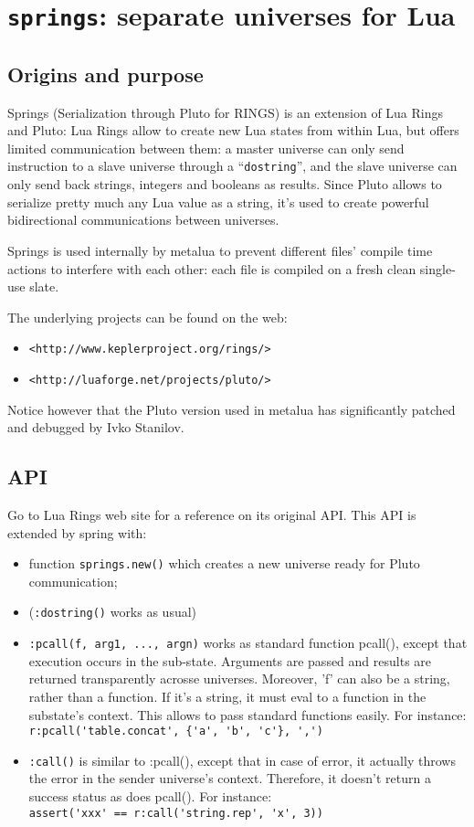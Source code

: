 \section{{\tt springs}: separate universes for Lua} 

\subsection{Origins and purpose}
Springs (Serialization through Pluto for RINGS) is an extension of Lua Rings and
Pluto: Lua Rings allow to create new Lua states from within Lua, but offers
limited communication between them: a master universe can only send instruction
to a slave universe through a ``{\tt dostring}'', and the slave universe can
only send back strings, integers and booleans as results. Since Pluto allows to
serialize pretty much any Lua value as a string, it's used to create powerful
bidirectional communications between universes.

Springs is used internally by metalua to prevent different files' compile time
actions to interfere with each other: each file is compiled on a fresh clean
single-use slate.

The underlying projects can be found on the web:
\begin{itemize}
\item \verb|<http://www.keplerproject.org/rings/>|
\item \verb|<http://luaforge.net/projects/pluto/>|
\end{itemize}
Notice however that the Pluto version used in metalua has significantly patched
and debugged by Ivko Stanilov.

\subsection{API}
Go to Lua Rings web site for a reference on its original API. This API is
extended by spring with:
\begin{itemize}
\item function {\tt springs.new()} which creates a new universe ready for Pluto
  communication;
\item ({\tt:dostring()} works as usual)
\item {\tt :pcall(f, arg1, ..., argn)} works as standard function pcall(),
  except that execution occurs in the sub-state. Arguments are passed and
  results are returned transparently acrosse universes. Moreover, 'f' can also
  be a string, rather than a function. If it's a string, it must eval to a
  function in the substate's context. This allows to pass standard functions
  easily. For instance:\\
  \verb|r:pcall('table.concat', {'a', 'b', 'c'}, ',')|
\item {\tt :call()} is similar to :pcall(), except that in case of error, it
  actually throws the error in the sender universe's context. Therefore, it
  doesn't return a success status as does pcall(). For instance: \\
  \verb|assert('xxx' == r:call('string.rep', 'x', 3))|
\end{itemize}
